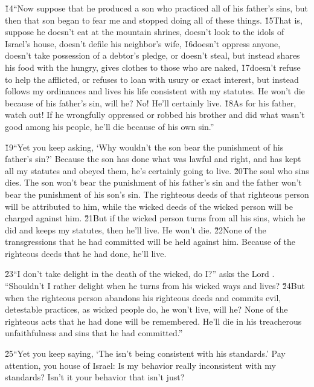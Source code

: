 \v{14}``Now suppose that he produced a son who practiced all of his father's sins, but then that son began to fear me and stopped doing all of these things. \v{15}That is, suppose he doesn't eat at the mountain shrines, doesn't look to the idols of Israel's house, doesn't defile his neighbor's wife, \v{16}doesn't oppress anyone, doesn't take possession of a debtor's pledge, or doesn't steal, but instead shares his food with the hungry, gives clothes to those who are naked, \v{17}doesn't refuse to help the afflicted, or refuses to loan with usury or exact interest, but instead follows my ordinances and lives his life consistent with my statutes. He won't die because of his father's sin, will he? No! He'll certainly live. \v{18}As for his father, watch out! If he wrongfully oppressed or robbed his brother and did what wasn't good among his people, he'll die because of his own sin.''

\v{19}``Yet you keep asking, `Why wouldn't the son bear the punishment of his father's sin?' Because the son has done what was lawful and right, and has kept all my statutes and obeyed them, he's certainly going to live. \v{20}The soul who sins dies. The son won't bear the punishment of his father's sin and the father won't bear the punishment of his son's sin. The righteous deeds of that righteous person will be attributed to him, while the wicked deeds of the wicked person will be charged against him. \v{21}But if the wicked person turns from all his sins, which he did and keeps my statutes, then he'll live. He won't die. \v{22}None of the transgressions that he had committed will be held against him. Because of the righteous deeds that he had done, he'll live.

\v{23}``I don't take delight in the death of the wicked, do I?'' asks the Lord . ``Shouldn't I rather delight when he turns from his wicked ways and lives? \v{24}But when the righteous person abandons his righteous deeds and commits evil, detestable practices, as wicked people do, he won't live, will he? None of the righteous acts that he had done will be remembered. He'll die in his treacherous unfaithfulness and sins that he had committed.''

\v{25}``Yet you keep saying, `The  isn't being consistent with his standards.' Pay attention, you house of Israel: Is my behavior really inconsistent with my standards? Isn't it your behavior that isn't just?

